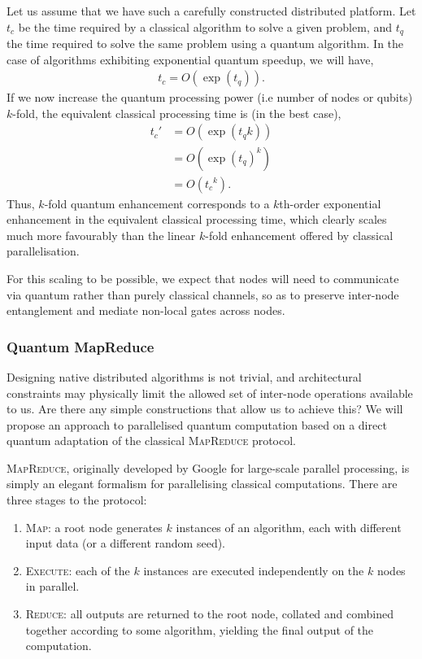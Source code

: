 Let us assume that we have such a carefully constructed distributed platform. Let $t_c$ be the time required by a classical algorithm to solve a given problem, and $t_q$ the time required to solve the same problem using a quantum algorithm. In the case of algorithms exhibiting exponential quantum speedup, we will have,
\begin{align}
t_c = O(\exp (t_q)).
\end{align}
If we now increase the quantum processing power (i.e number of nodes or qubits) $k$-fold, the equivalent classical processing time is (in the best case),
\begin{align}
t_c' &= O(\exp (t_q k)) \nonumber \\
&= O(\exp (t_q)^{k}) \nonumber \\
&= O({t_c}^{k}).
\end{align}
Thus, $k$-fold quantum enhancement corresponds to a $k$th-order exponential enhancement in the equivalent classical processing time, which clearly scales much more favourably than the linear $k$-fold enhancement offered by classical parallelisation.

For this scaling to be possible, we expect that nodes will need to communicate via quantum rather than purely classical channels, so as to preserve inter-node entanglement and mediate non-local gates across nodes.


\subsubsection{Quantum MapReduce}\label{sec:quant_map_reduce}

Designing native distributed algorithms is not trivial, and architectural constraints may physically limit the allowed set of inter-node operations available to us. Are there any simple constructions that allow us to achieve this? We will propose an approach to parallelised quantum computation based on a direct quantum adaptation of the classical \textsc{MapReduce} protocol.

\textsc{MapReduce}, originally developed by Google for large-scale parallel processing, is simply an elegant formalism for parallelising classical computations. There are three stages to the protocol:
\begin{enumerate}
	\item \textsc{Map}: a root node generates $k$ instances of an algorithm, each with different input data (or a different random seed).
	\item \textsc{Execute}: each of the $k$ instances are executed independently on the $k$ nodes in parallel.
	\item \textsc{Reduce}: all outputs are returned to the root node, collated and combined together according to some algorithm, yielding the final output of the computation.
\end{enumerate}

